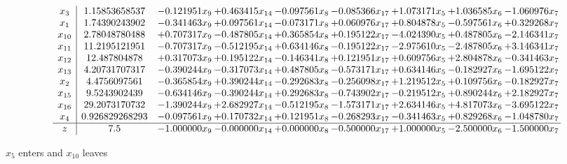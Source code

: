 \documentclass[10pt]{article}
\begin{document}
 \[\begin{array}{c| c c@{\hskip 2pt} c@{\hskip 2pt} c@{\hskip 2pt} c@{\hskip 2pt} c@{\hskip 2pt} c@{\hskip 2pt} c@{\hskip 2pt} }
 x_{3}   &  1.15853658537 & -0.121951 x_{9} & + 0.463415 x_{14} & -0.097561 x_{8} & -0.085366 x_{17} & + 1.073171 x_{5} & + 1.036585 x_{6} & -1.060976 x_{7}\\
 x_{1}   &  1.74390243902 & -0.341463 x_{9} & + 0.097561 x_{14} & -0.073171 x_{8} & + 0.060976 x_{17} & + 0.804878 x_{5} & -0.597561 x_{6} & + 0.329268 x_{7}\\
 x_{10}   &  2.78048780488 & + 0.707317 x_{9} & -0.487805 x_{14} & + 0.365854 x_{8} & + 0.195122 x_{17} & -4.024390 x_{5} & + 0.487805 x_{6} & -2.146341 x_{7}\\
 x_{11}   &  11.2195121951 & -0.707317 x_{9} & -0.512195 x_{14} & + 0.634146 x_{8} & -0.195122 x_{17} & -2.975610 x_{5} & -2.487805 x_{6} & + 3.146341 x_{7}\\
 x_{12}   &  12.487804878 & + 0.317073 x_{9} & + 0.195122 x_{14} & -0.146341 x_{8} & + 0.121951 x_{17} & + 0.609756 x_{5} & + 2.804878 x_{6} & -0.341463 x_{7}\\
 x_{13}   &  4.20731707317 & -0.390244 x_{9} & -0.317073 x_{14} & + 0.487805 x_{8} & -0.573171 x_{17} & + 0.634146 x_{5} & -0.182927 x_{6} & -1.695122 x_{7}\\
 x_{2}   &  4.4756097561 & -0.365854 x_{9} & + 0.390244 x_{14} & -0.292683 x_{8} & -0.256098 x_{17} & + 1.219512 x_{5} & + 0.109756 x_{6} & -0.182927 x_{7}\\
 x_{15}   &  9.5243902439 & -0.634146 x_{9} & -0.390244 x_{14} & + 0.292683 x_{8} & -0.743902 x_{17} & -0.219512 x_{5} & + 0.890244 x_{6} & + 2.182927 x_{7}\\
 x_{16}   &  29.2073170732 & -1.390244 x_{9} & + 2.682927 x_{14} & -0.512195 x_{8} & -1.573171 x_{17} & + 2.634146 x_{5} & + 4.817073 x_{6} & -3.695122 x_{7}\\
 x_{4}   &  0.926829268293 & -0.097561 x_{9} & + 0.170732 x_{14} & + 0.121951 x_{8} & -0.268293 x_{17} & -0.341463 x_{5} & + 0.829268 x_{6} & -1.048780 x_{7}\\
\hline
z    &  7.5 & -1.000000 x_{9} & -0.000000 x_{14} & + 0.000000 x_{8} & -0.500000 x_{17} & + 1.000000 x_{5} & -2.500000 x_{6} & -1.500000 x_{7}\\
\end{array}\]


 $ x_{5} $ enters and $ x_{10} $ leaves 
\end{document}
